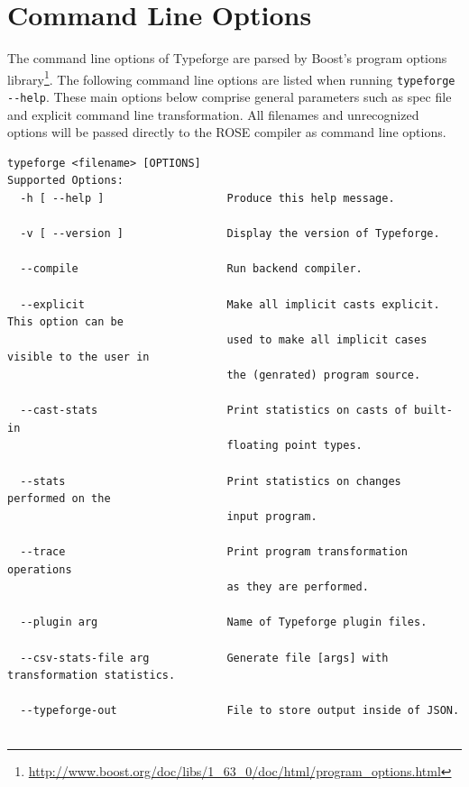 \documentclass[natbib]{article}
\begin{document}
\section{Command Line Options}
The command line options of Typeforge are parsed by Boost's program options 
library\footnote{\url{http://www.boost.org/doc/libs/1_63_0/doc/html/program_options.html}}.
The following command line options are listed when running \verb+typeforge --help+.
These main options below comprise general parameters such as spec file and explicit command line 
transformation. All filenames and unrecognized options will be passed directly to the ROSE compiler 
as command line options.

\begin{verbatim}
typeforge <filename> [OPTIONS]
Supported Options:
  -h [ --help ]                   Produce this help message.
  
  -v [ --version ]                Display the version of Typeforge.
  
  --compile                       Run backend compiler.
  
  --explicit                      Make all implicit casts explicit. This option can be
                                  used to make all implicit cases visible to the user in
                                  the (genrated) program source.
  
  --cast-stats                    Print statistics on casts of built-in 
                                  floating point types.
                                  
  --stats                         Print statistics on changes performed on the
                                  input program.

  --trace                         Print program transformation operations 
                                  as they are performed.

  --plugin arg                    Name of Typeforge plugin files.
  
  --csv-stats-file arg            Generate file [args] with transformation statistics.
  
  --typeforge-out                 File to store output inside of JSON.
  
\end{verbatim}
\end{document}
